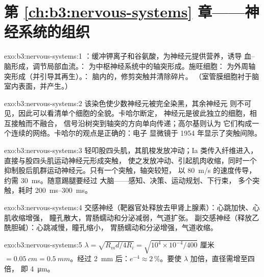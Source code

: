 \section*{第 \ref{ch:b3:nervous-systems} 章——神经系统的组织}

\begin{solution}{exo:b3:nervous-systems:1}
：缓冲钾离子和谷氨酸，为神经元提供营养，诱导
血–脑形成，调节局部血流。：
为中枢神经系统中的轴突形成。施旺细胞：
为外周轴突形成（并引导其再生）。：
脑内的，修剪突触并清除碎片。
（室管膜细胞衬于脑室内表面，并产生。）
\end{solution}

\begin{solution}{exo:b3:nervous-systems:2}
该染色使少数神经元被完全染黑，其余神经元
则不可见，因此可以看清单个细胞的全貌。卡哈尔断定，
神经元是彼此独立的细胞，相互接触而不融合，
信号沿树突到轴突的方向单向传递；高尔基则认为
它们构成一个连续的网络。卡哈尔的观点是正确的：电子
显微镜于 1954 年显示了突触间隙。
\end{solution}

\begin{solution}{exo:b3:nervous-systems:3}
轻叩股四头肌，其肌梭发放冲动；Ia
类传入纤维进入，直接与股四头肌运动神经元形成突触，
使之发放冲动、引起肌肉收缩，同时一个
抑制股后肌群运动神经元。只有一个突触，轴突较短，
以 \qty{80}{m/s} 的速度传导，约需 \qty{30}{ms}。随意踢腿要经过
大脑——感知、决策、运动规划、下行束，
多个突触，耗时 \qtyrange{200}{300}{ms}。
\end{solution}

\begin{solution}{exo:b3:nervous-systems:4}
交感神经（靶器官处释放去甲肾上腺素）：心跳加快、心肌收缩增强，
瞳孔散大，胃肠蠕动和分泌减弱，气道扩张。
副交感神经（释放乙酰胆碱）：心跳减慢，瞳孔缩小，
胃肠蠕动和分泌增强，气道收缩。
\end{solution}

\begin{solution}{exo:b3:nervous-systems:5}
$\lambda = \sqrt{R_{m}d/4R_{i}} = \sqrt{10^{4}\times 10^{-4}/400}$ 厘米
$= \qty{0.05}{cm} = \qty{0.5}{mm}$。经过 \qty{2}{mm} 后：$e^{-4} \approx
2\,\%$。要使 $\lambda$ 加倍，直径需增至四倍，
即 \qty{4}{\micro m}。
\end{solution}

